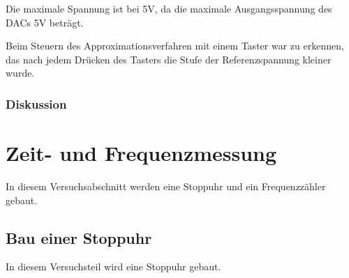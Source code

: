\documentclass[12pt,a4paper]{article}
\begin{document}
Die maximale Spannung ist bei 5V, da die maximale Ausgangsspannung des DACs 5V beträgt.

Beim Steuern des Approximationsverfahren mit einem Taster war zu erkennen, das nach jedem Drücken des Tasters die Stufe der Referenzspannung kleiner wurde.

\subsubsection*{Diskussion}




\section{Zeit- und Frequenzmessung}

In diesem Versuchsabschnitt werden eine Stoppuhr und ein Frequenzzähler gebaut.

\subsection{Bau einer Stoppuhr}

In diesem Versuchsteil wird eine Stoppuhr gebaut.
\end{document}
